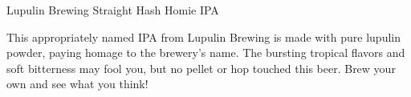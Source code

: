 \begin{recipie}{Lupulin Brewing Straight Hash Homie IPA}

\begin{aboutblock}
This appropriately named IPA from Lupulin Brewing is made with pure lupulin powder,
paying homage to the brewery's name. The bursting tropical flavors and soft bitterness
may fool you, but no pellet or hop touched this beer. Brew your own and see what you think!
\end{aboutblock}


\begin{methodandtiming}
 
\begin{mashsteps}
\end{mashsteps}

\begin{fermentationsteps}
\end{fermentationsteps}

\end{methodandtiming}

\pagebreak

\begin{ingredientsblock}

\begin{malts}
\end{malts}

\begin{hops}
\end{hops}

\begin{yeasts}
\end{yeasts}

\end{ingredientsblock}

\end{recipie}

